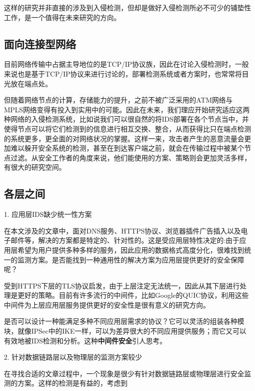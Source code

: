\documentclass[11pt]{article} %
\begin{document}
这样的研究并非直接的涉及到入侵检测，但却是做好入侵检测所必不可少的铺垫性工作，是一个值得在未来研究的方向。

\subsection{面向连接型网络}
\label{connect}

目前网络传输中占据主导地位的是TCP/IP协议族，因此在讨论入侵检测时，一般来说也是基于TCP/IP协议来进行讨论的，部署检测系统或者方案时，也常常将目光放在端点处。

但随着网络节点的计算，存储能力的提升，之前不被广泛采用的ATM网络与MPLS网络变得有投入到实用中的可能。因此在未来，我们理应开始研究适应这两种网络的入侵检测系统，比如说我们可以很自然的将IDS部署在各个节点当中，并使得节点可以将它们检测到的信息进行相互交换、整合，从而获得比只在端点检测的系统更多，更全面的对网络状况的掌握。这样一来，攻击者产生的恶意流量会更加难以躲开安全系统的检测，甚至在到达客户端之前，就会在传输过程中被某个节点过滤。从安全工作者的角度来说，他们能使用的方案、策略则会更加灵活多样，有很大的研究空间。

\subsection{各层之间}
\label{layer}

1. 应用层IDS缺少统一性方案

在本文涉及的文章中，面对DNS服务、HTTPS协议、浏览器插件广告插入以及电子邮件等，解决的方案都是特定的、针对性的。这是受应用层特性决定的:由于应用层希望为用户提供多种多样的服务，因此应用的数据格式高度分化，很难找到统一的监测方案。是否能找到一种通用性的解决方案为应用层提供更好的安全保障呢？

受到HTTPS下层的TLS协议启发，由于上层注定无法统一，因此从其下层进行处理是更好的策略。目前有许多流行的中间件，比如Google的QUIC协议，利用这些中间件为上层应用层服务提供更好的安全性是很有意义的研究方向。

是否可以设计一种能满足多种不同应用层需求的协议？它可以灵活的组装各种模块，就像IPSec中的IKE一样，可以为差异很大的不同应用提供服务；而它又可以有效地被IDS检测和分析。这种\textbf{中间件安全}引人思考。

2. 针对数据链路层以及物理层的监测方案较少

在寻找合适的文章过程中，一个现象是很少有针对数据链路层或物理层进行安全监测的方案。这样的检测是有益的，考虑到
\end{document}
